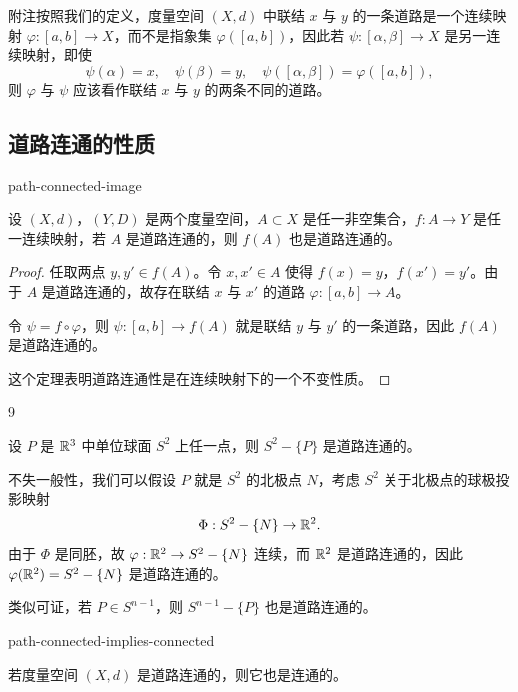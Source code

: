 附注\quad 按照我们的定义，度量空间 $(X,d)$ 中联结 $x$ 与 $y$ 的一条道路是一个连续映射 $\varphi:[a,b]\to X$，而不是指象集 $\varphi([a,b])$，因此若 $\psi:[\alpha,\beta]\to X$ 是另一连续映射，即使
\[\psi(\alpha)=x,\quad\psi(\beta)=y,\quad\psi([\alpha,\beta])=\varphi([a,b]),\]
则 $\varphi$ 与 $\psi$ 应该看作联结 $x$ 与 $y$ 的两条不同的道路。

\subsection{道路连通的性质}

\begin{mythm}{}{path-connected-image}

设 $(X,d)$，$(Y,D)$ 是两个度量空间，$A\subset X$ 是任一非空集合，$f:A\to Y$ 是任一连续映射，若 $A$ 是道路连通的，则 $f(A)$ 也是道路连通的。

\end{mythm}

\begin{proof}

任取两点 $y,y'\in f(A)$。令 $x,x'\in A$ 使得 $f(x)=y$，$f(x')=y'$。由于 $A$ 是道路连通的，故存在联结 $x$ 与 $x'$ 的道路 $\varphi:[a,b]\to A$。

令 $\psi=f\circ\varphi$，则 $\psi:[a,b]\to f(A)$ 就是联结 $y$ 与 $y'$ 的一条道路，因此 $f(A)$ 是道路连通的。

这个定理表明道路连通性是在连续映射下的一个不变性质。

\end{proof}

\begin{sourceexample}{9}

设 $P$ 是 $\mathbb{R}^3$ 中单位球面 $S^2$ 上任一点，则 $S^2-\{P\}$ 是道路连通的。

不失一般性，我们可以假设 $P$ 就是 $S^2$ 的北极点 $N$，考虑 $S^2$ 关于北极点的球极投影映射
\[\Phi:S^2-\{N\}\to\mathbb{R}^2.\]
由于 $\Phi$ 是同胚，故 $\varphi:\mathbb{R}^2\to S^2-\{N\}$ 连续，而 $\mathbb{R}^2$ 是道路连通的，因此 $\varphi(\mathbb{R}^2)=S^2-\{N\}$ 是道路连通的。

类似可证，若 $P\in S^{n-1}$，则 $S^{n-1}-\{P\}$ 也是道路连通的。

\end{sourceexample}

\begin{mythm}{}{path-connected-implies-connected}

若度量空间 $(X,d)$ 是道路连通的，则它也是连通的。

\end{mythm}

